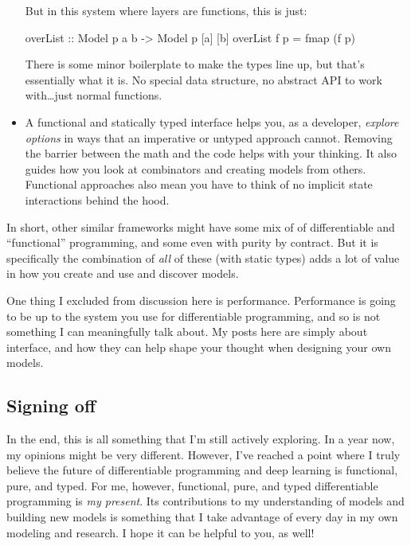 \documentclass[]{article}
\newenvironment{Shaded}{}{}
\newcommand{\DataTypeTok}[1]{\textcolor[rgb]{0.56,0.13,0.00}{#1}}
\newcommand{\FunctionTok}[1]{\textcolor[rgb]{0.02,0.16,0.49}{#1}}
\newcommand{\NormalTok}[1]{#1}
\newcommand{\OtherTok}[1]{\textcolor[rgb]{0.00,0.44,0.13}{#1}}
\begin{document}
\begin{itemize}
  But in this system where layers are functions, this is just:

\begin{Shaded}
\begin{Highlighting}[]
\OtherTok{overList ::} \DataTypeTok{Model}\NormalTok{ p a b }\OtherTok{{-}\textgreater{}} \DataTypeTok{Model}\NormalTok{ p [a] [b]}
\NormalTok{overList f p }\OtherTok{=} \FunctionTok{fmap}\NormalTok{ (f p)}
\end{Highlighting}
\end{Shaded}

  There is some minor boilerplate to make the types line up, but that's
  essentially what it is. No special data structure, no abstract API to work
  with\ldots just normal functions.
\item
  A functional and statically typed interface helps you, as a developer,
  \emph{explore options} in ways that an imperative or untyped approach cannot.
  Removing the barrier between the math and the code helps with your thinking.
  It also guides how you look at combinators and creating models from others.
  Functional approaches also mean you have to think of no implicit state
  interactions behind the hood.
\end{itemize}

In short, other similar frameworks might have some mix of of differentiable and
``functional'' programming, and some even with purity by contract. But it is
specifically the combination of \emph{all} of these (with static types) adds a
lot of value in how you create and use and discover models.

One thing I excluded from discussion here is performance. Performance is going
to be up to the system you use for differentiable programming, and so is not
something I can meaningfully talk about. My posts here are simply about
interface, and how they can help shape your thought when designing your own
models.

\subsection{Signing off}\label{signing-off}

In the end, this is all something that I'm still actively exploring. In a year
now, my opinions might be very different. However, I've reached a point where I
truly believe the future of differentiable programming and deep learning is
functional, pure, and typed. For me, however, functional, pure, and typed
differentiable programming is \emph{my present}. Its contributions to my
understanding of models and building new models is something that I take
advantage of every day in my own modeling and research. I hope it can be helpful
to you, as well!
\end{document}
